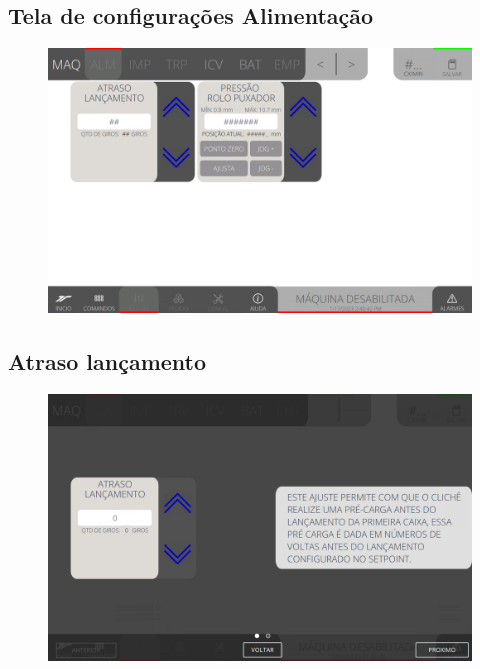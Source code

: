 
\newpage
\thispagestyle{fancy}
\vspace{\fill}
\subsection{Tela de configurações Alimentação}
\begin{figure}
    \centering
    \includegraphics[width=480 px,height=300 px]{src/imagesICV/03-feeder/settings/1.png}
\end{figure}

\newpage
\thispagestyle{fancy}
\vspace{\fill}
\subsection{Atraso lançamento}
\begin{figure}
    \centering
    \includegraphics[width=576 px,height=360 px]{src/imagesICV/03-feeder/settings/2.png}
\end{figure}

